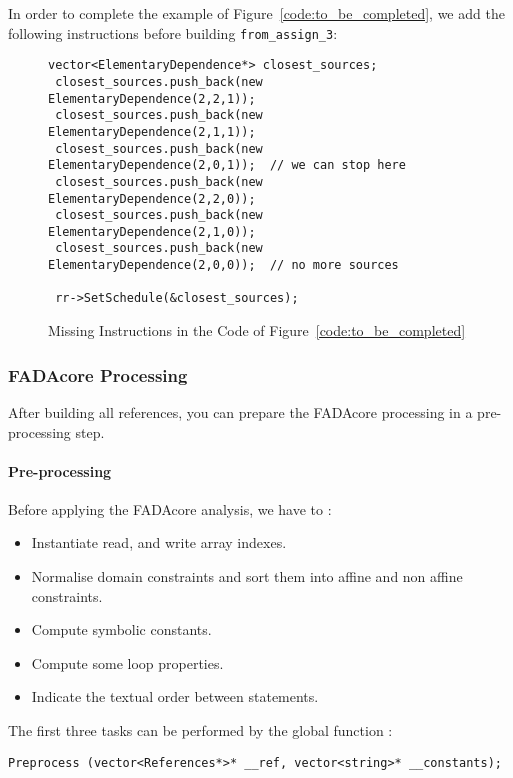 In order to complete the example of Figure~\ref{code:to_be_completed}, we add the following instructions before building \verb|from_assign_3|:
\begin{figure}[!h]
\begin{footnotesize}\begin{lstlisting}[frame=single,framerule=0pt]
 vector<ElementaryDependence*> closest_sources;
 closest_sources.push_back(new ElementaryDependence(2,2,1));
 closest_sources.push_back(new ElementaryDependence(2,1,1));
 closest_sources.push_back(new ElementaryDependence(2,0,1));  // we can stop here
 closest_sources.push_back(new ElementaryDependence(2,2,0));
 closest_sources.push_back(new ElementaryDependence(2,1,0));
 closest_sources.push_back(new ElementaryDependence(2,0,0));  // no more sources

 rr->SetSchedule(&closest_sources);

\end{lstlisting}
\end{footnotesize}
\caption{Missing Instructions in the Code of Figure~\ref{code:to_be_completed}}
\label{code:schedules}
\end{figure}

\subsubsection{FADAcore Processing}
After building all references, you can prepare the FADAcore processing in a pre-processing step.

\paragraph{Pre-processing}
Before applying the FADAcore analysis, we have to :
\begin{itemize}
 \item Instantiate read, and write array indexes.
 \item Normalise domain constraints and sort them into affine and non affine constraints.
 \item Compute symbolic constants.
 \item Compute some loop properties.
 \item Indicate the textual order between statements.
\end{itemize}

The first three tasks can be performed by the global function :
\begin{footnotesize}\begin{lstlisting}[frame=single,framerule=0pt]
Preprocess (vector<References*>* __ref, vector<string>* __constants);
\end{lstlisting}
\end{footnotesize}

